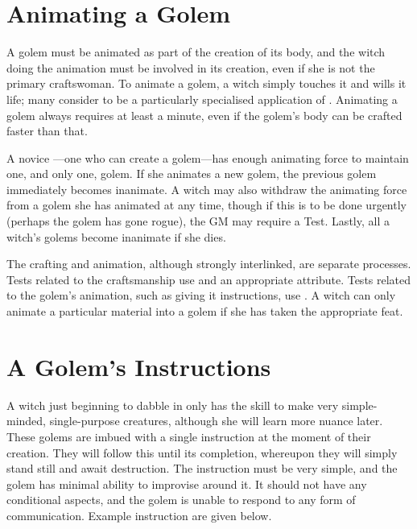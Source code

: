 
\section{Animating a Golem}

A golem must be animated as part of the creation of its body, and the witch doing the animation must be involved in its creation, even if she is not the primary craftswoman.
To animate a golem, a witch simply touches it and wills it life; many consider  to be a particularly specialised application of .
Animating a golem always requires at least a minute, even if the golem's body can be crafted faster than that.

A novice ---one who can create a golem---has enough animating force to maintain one, and only one, golem.
If she animates a new golem, the previous golem immediately becomes inanimate.
A witch may also withdraw the animating force from a golem she has animated at any time, though if this is to be done urgently (perhaps the golem has gone rogue), the GM may require a Test.
Lastly, all a witch's golems become inanimate if she dies.

The crafting and animation, although strongly interlinked, are separate processes.
Tests related to the craftsmanship use  and an appropriate attribute.
Tests related to the golem's animation, such as giving it instructions, use .
A witch can only animate a particular material into a golem if she has taken the appropriate feat.

\section{A Golem's Instructions}

A witch just beginning to dabble in  only has the skill to make very simple-minded, single-purpose creatures, although she will learn more nuance later.
These golems are imbued with a single instruction at the moment of their creation.
They will follow this until its completion, whereupon they will simply stand still and await destruction.
The instruction must be very simple, and the golem has minimal ability to improvise around it.
It should not have any conditional aspects, and the golem is unable to respond to any form of communication.
Example instruction are given below.

